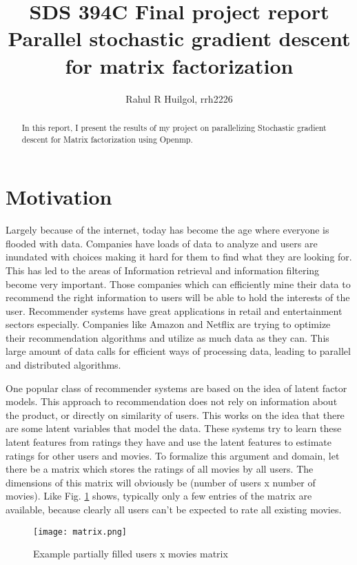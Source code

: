 \documentclass[a4paper,11pt]{article}
\title{SDS 394C Final project report\\{\Large Parallel stochastic gradient descent for matrix factorization}}
\author{Rahul R Huilgol, rrh2226}
\begin{document}
\maketitle
\tableofcontents

\begin{abstract}
In this report, I present the results of my project on parallelizing Stochastic gradient descent for Matrix factorization using Openmp. 
\end{abstract}

\section{Motivation}
Largely because of the internet, today has become the age where everyone is flooded with data. Companies have loads of data to analyze and users are inundated with choices making it hard for them to find what they are looking for. This has led to the areas of Information retrieval and information filtering become very important. Those companies which can efficiently mine their data to recommend the right information to users will be able to hold the interests of the user. Recommender systems have great applications in retail and entertainment sectors especially. Companies like Amazon and Netflix are trying to optimize their recommendation algorithms and utilize as much data as they can. This large amount of data calls for efficient ways of processing data, leading to parallel and distributed algorithms.

One popular class of recommender systems are based on the idea of latent factor models. This approach to recommendation does not rely on information about the product, or directly on similarity of users. This works on the idea that there are some latent variables that model the data. These systems try to learn these latent features from ratings they have and use the latent features to estimate ratings for other users and movies. To formalize this argument and domain, let there be a matrix which stores the ratings of all movies by all users. The dimensions of this matrix will obviously be (number of users x number of movies). Like Fig. \ref{fig:matrix} shows, typically only a few entries of the matrix are available, because clearly all users can't be expected to rate all existing movies.

\begin{figure}[h]
   \centering
    \texttt{[image: matrix.png]}
    \caption{Example partially filled users x movies matrix}
   \label{fig:matrix}
\end{figure}
\end{document}
